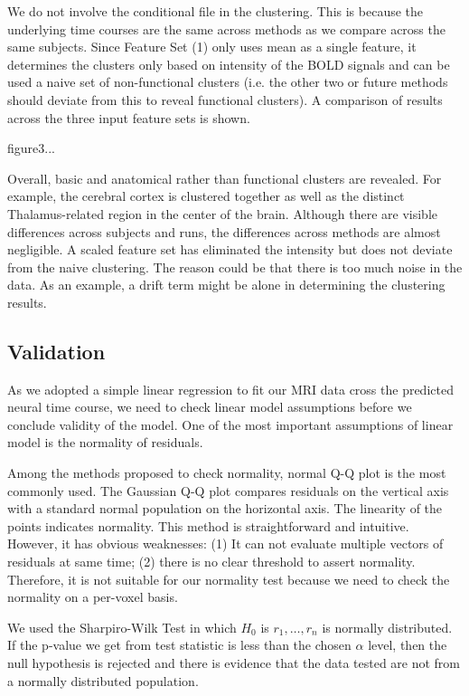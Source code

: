 \documentclass[11pt]{article}
\begin{document}
We do not involve the conditional file in the clustering. This is because the
underlying time courses are the same across methods as we compare across the
same subjects. Since Feature Set (1) only uses mean as a single feature, it
determines the clusters only based on intensity of the BOLD signals and can be
used a naive set of non-functional clusters (i.e. the other two or future
methods should deviate from this to reveal functional clusters). A comparison of
results across the three input feature sets is shown.

figure3...

Overall, basic and anatomical rather than functional clusters are revealed. For
example, the cerebral cortex is clustered together as well as the distinct
Thalamus-related region in the center of the brain.  Although there are visible
differences across subjects and runs, the differences across methods are almost
negligible. A scaled feature set has eliminated the intensity but does not
deviate from the naive clustering. The reason could be that there is too much
noise in the data. As an example, a drift term might be alone in determining the
clustering results. 

\subsection{Validation}

As we adopted a simple linear regression to fit our MRI data cross the predicted
neural time course, we need to check linear model assumptions before we conclude
validity of the model. One of the most important assumptions of linear model is
the normality of residuals.

Among the methods proposed to check normality, normal Q-Q plot is the most
commonly used. The Gaussian Q-Q plot compares residuals on the vertical axis
with a standard normal population on the horizontal axis. The linearity of the
points indicates normality. This method is straightforward and
intuitive. However, it has obvious weaknesses: (1) It can not evaluate multiple
vectors of residuals at same time; (2) there is no clear threshold to assert
normality. Therefore, it is not suitable for our normality test because we need
to check the normality on a per-voxel basis.

We used the Sharpiro-Wilk Test in which $H_0$ is $r_1,\dots ,r_n$ is normally
distributed. If the p-value we get from test statistic is less than the chosen
$\alpha$ level, then the null hypothesis is rejected and there is evidence that
the data tested are not from a normally distributed population.
\end{document}
